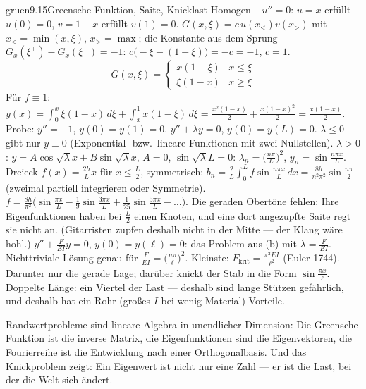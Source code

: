 \begin{loesungkarte}{gruen}{9.15}{Greensche Funktion, Saite, Knicklast}
Homogen $-u'' = 0$: $u = x$ erfüllt $u(0) = 0$, $v = 1 - x$ erfüllt $v(1) = 0$. $G(x, \xi) = c\,u(x_<)v(x_>)$ mit $x_< = \min(x, \xi)$, $x_> = \max$; die Konstante aus dem Sprung $G_x(\xi^{+}) - G_x(\xi^{-}) = -1$: $c\bigl(-\xi - (1 - \xi)\bigr) = -c = -1$, $c = 1$.
\[ G(x, \xi) = \begin{cases}x(1 - \xi) & x\le\xi\\ \xi(1 - x) & x\ge\xi\end{cases} \]
Für $f\equiv1$: $y(x) = \int_0^{x}\xi(1 - x)\,d\xi + \int_x^{1}x(1 - \xi)\,d\xi = \frac{x^{2}(1 - x)}2 + \frac{x(1 - x)^{2}}2 = \frac{x(1 - x)}2$. Probe: $y'' = -1$, $y(0) = y(1) = 0$. \checkmark
{}
$y'' + \lambda y = 0$, $y(0) = y(L) = 0$. $\lambda\le0$ gibt nur $y\equiv0$ (Exponential- bzw.\ lineare Funktionen mit zwei Nullstellen). $\lambda > 0$: $y = A\cos\sqrt\lambda x + B\sin\sqrt\lambda x$, $A = 0$, $\sin\sqrt\lambda L = 0$: $\lambda_n = \bigl(\frac{n\pi}L\bigr)^{2}$, $y_n = \sin\frac{n\pi x}L$. Dreieck $f(x) = \frac{2h}Lx$ für $x\le\frac L2$, symmetrisch: $b_n = \frac2L\int_0^{L}f\sin\frac{n\pi x}L\,dx = \frac{8h}{n^{2}\pi^{2}}\sin\frac{n\pi}2$ (zweimal partiell integrieren oder Symmetrie). $f = \frac{8h}{\pi^{2}}\bigl(\sin\frac{\pi x}L - \frac19\sin\frac{3\pi x}L + \frac1{25}\sin\frac{5\pi x}L - \dots\bigr)$. Die geraden Obertöne fehlen: Ihre Eigenfunktionen haben bei $\frac L2$ einen Knoten, und eine dort angezupfte Saite regt sie nicht an. (Gitarristen zupfen deshalb nicht in der Mitte --- der Klang wäre hohl.)
$y'' + \frac F{EI}y = 0$, $y(0) = y(\ell) = 0$: das Problem aus (b) mit $\lambda = \frac F{EI}$. Nichttriviale Lösung genau für $\frac F{EI} = \bigl(\frac{n\pi}\ell\bigr)^{2}$. Kleinste: $F_{\text{krit}} = \frac{\pi^{2}EI}{\ell^{2}}$ (Euler 1744). Darunter nur die gerade Lage; darüber knickt der Stab in die Form $\sin\frac{\pi x}\ell$. Doppelte Länge: ein Viertel der Last --- deshalb sind lange Stützen gefährlich, und deshalb hat ein Rohr (großes $I$ bei wenig Material) Vorteile.
\begin{mitnehmen}\kastentext
Randwertprobleme sind lineare Algebra in unendlicher Dimension: Die Greensche Funktion ist die inverse Matrix, die Eigenfunktionen sind die Eigenvektoren, die Fourierreihe ist die Entwicklung nach einer Orthogonalbasis. Und das Knickproblem zeigt: Ein Eigenwert ist nicht nur eine Zahl --- er ist die Last, bei der die Welt sich ändert.
\end{mitnehmen}
\end{loesungkarte}

